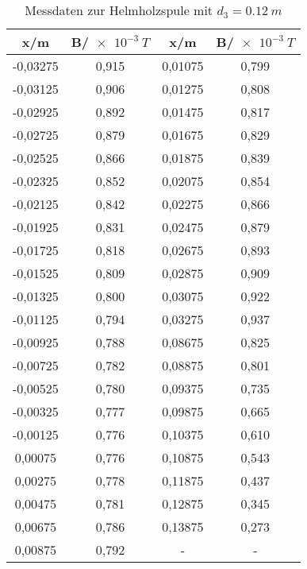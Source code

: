 
\begin{table}[h!]
  \centering
  \caption{Messdaten zur Helmholzspule mit $d_{3}=\SI{0.12}{m}$}
  \label{tab:h12}
  \begin{tabular}{c c c c}
    \toprule
     x/m &	 B/$\SI{e-3}{T}$  &  x/m &	 B/$\SI{e-3}{T}$ \\
    \midrule
    -0,03275	& 0,915 &      0,01075	& 0,799\\
    -0,03125	& 0,906 &      0,01275	& 0,808\\
    -0,02925	& 0,892 &      0,01475	& 0,817\\
    -0,02725	& 0,879 &      0,01675	& 0,829\\
    -0,02525	& 0,866 &      0,01875	& 0,839\\
    -0,02325	& 0,852 &      0,02075	& 0,854\\
    -0,02125	& 0,842 &      0,02275	& 0,866\\
    -0,01925	& 0,831 &      0,02475	& 0,879\\
    -0,01725	& 0,818 &      0,02675	& 0,893\\
    -0,01525	& 0,809 &      0,02875	& 0,909\\
    -0,01325	& 0,800 &      0,03075	& 0,922\\
    -0,01125	& 0,794 &      0,03275	& 0,937\\
    -0,00925	& 0,788 &      0,08675  & 0,825\\
    -0,00725	& 0,782 &      0,08875  & 0,801\\
    -0,00525	& 0,780 &      0,09375  & 0,735\\
    -0,00325	& 0,777 &      0,09875  & 0,665\\
    -0,00125	& 0,776 &      0,10375	& 0,610\\
     0,00075	& 0,776 &      0,10875	& 0,543\\
     0,00275	& 0,778 &      0,11875	& 0,437\\
     0,00475	& 0,781 &      0,12875	& 0,345\\
     0,00675	& 0,786 &      0,13875	& 0,273\\
     0,00875	& 0,792 &          -    &   -  \\

    \bottomrule
  \end{tabular}
\end{table}
